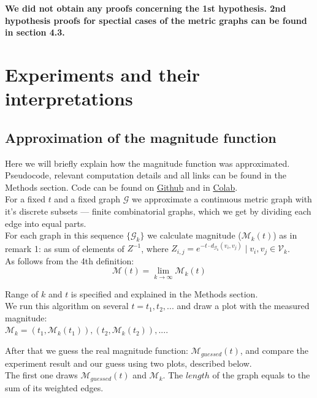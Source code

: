 \documentclass{article}
\begin{document}
\textbf{We did not obtain any proofs concerning the 1st hypothesis. 
2nd hypothesis proofs for spectial cases of the metric graphs can be found in section 4.3. }

\section{Experiments and their interpretations}
\subsection{Approximation of the magnitude function}

Here we will briefly explain how the magnitude function was approximated.
Pseudocode, relevant computation details and all links can be found in the Methods section. 
Code can be found on \href{https://github.com/mmanchkin/magnitude}{Github} and in
\href{https://colab.research.google.com/drive/17Wlg996wKO1tZD9EBfn9G5qiL2nD_5LM?usp=sharing}{Colab}.
\\

For a fixed $t$ and a fixed graph $\mathcal{G}$ we approximate a continuous metric graph with it's discrete subsets
--- finite combinatorial graphs, which we get by dividing each edge into equal parts.
\\

For each graph in this sequence $\{\mathcal{G}_{k}\}$ we calculate magnitude ($\mathcal{M}_k(t)$) as in
remark 1: as sum of elements of $Z^{-1}$, where $Z_{i, j} = e^{-t \cdot d_{\mathcal{G}_k}(v_i, v_j)} \mid v_i, v_j \in \mathcal{V}_k$. \\

As follows from the 4th definition:
$$ \mathcal{M}(t) = \lim_{k \to \infty} \mathcal{M}_k(t)$$

Range of $k$ and $t$ is specified and explained in the Methods section.
\\

We run this algorithm on several $t = {t_1, t_2, ...}$ and draw a plot with the measured
magnitude: \\ $\mathcal{M}_{k} = (t_1, \mathcal{M}_k(t_1)), (t_2, \mathcal{M}_k(t_2)), ...$. 

After that we guess the real magnitude function: $\mathcal{M}_{guessed}(t)$, and compare the
experiment result and our guess using two plots, described below.
\\

The first one draws $\mathcal{M}_{guessed}(t)$ and $\mathcal{M}_{k}$. The $length$ of the graph equals to the sum of
 its weighted edges. 
\\
\end{document}
